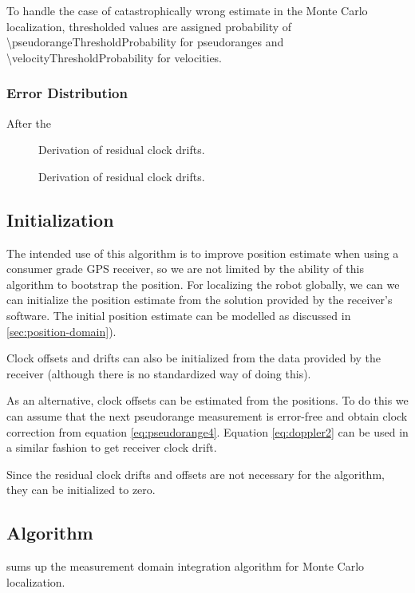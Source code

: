 To handle the case of catastrophically wrong estimate in the Monte Carlo localization,
thresholded values are assigned probability of \num{\pseudorangeThresholdProbability} for
pseudoranges and \num{\velocityThresholdProbability} for velocities.

\subsubsection{Error Distribution}
After the 

\begin{figure}[p]
	\centering
	\caption{Derivation of residual clock drifts.}
	\label{fig:}
\end{figure}

\begin{figure}[p]
	\centering
	\caption{Derivation of residual clock drifts.}
	\label{fig:residual-clock-drift-derivation}
\end{figure}


\subsection{Initialization}
The intended use of this algorithm is to improve position estimate when using
a consumer grade GPS receiver, so we are not limited by the ability of this
algorithm to bootstrap the position.
For localizing the robot globally, we can we can initialize the position
estimate from the solution provided by the receiver's software.
The initial position estimate can be modelled as discussed in \cref{sec:position-domain}).

Clock offsets and drifts can also be initialized from the data provided by the
receiver (although there is no standardized way of doing this).

As an alternative, clock offsets can be estimated from the positions.
To do this we can assume that the next pseudorange measurement is error-free
and obtain clock correction from equation \eqref{eq:pseudorange4}.
Equation \eqref{eq:doppler2} can be used in a similar fashion to get receiver clock drift.

Since the residual clock drifts and offsets are not necessary for the algorithm,
they can be initialized to zero.

\subsection{Algorithm}
 sums up the measurement domain integration
algorithm for Monte Carlo localization.

